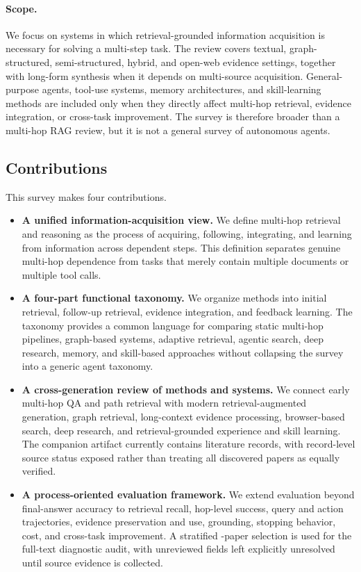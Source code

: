 \paragraph{Scope.}
We focus on systems in which retrieval-grounded information acquisition is necessary for solving a multi-step task. The review covers textual, graph-structured, semi-structured, hybrid, and open-web evidence settings, together with long-form synthesis when it depends on multi-source acquisition. General-purpose agents, tool-use systems, memory architectures, and skill-learning methods are included only when they directly affect multi-hop retrieval, evidence integration, or cross-task improvement. The survey is therefore broader than a multi-hop RAG review, but it is not a general survey of autonomous agents.

\subsection{Contributions}
\label{subsec:contributions}

This survey makes four contributions.

\begin{itemize}[leftmargin=1.35em]
\item \textbf{A unified information-acquisition view.} We define multi-hop retrieval and reasoning as the process of acquiring, following, integrating, and learning from information across dependent steps. This definition separates genuine multi-hop dependence from tasks that merely contain multiple documents or multiple tool calls.

\item \textbf{A four-part functional taxonomy.} We organize methods into initial retrieval, follow-up retrieval, evidence integration, and feedback learning. The taxonomy provides a common language for comparing static multi-hop pipelines, graph-based systems, adaptive retrieval, agentic search, deep research, memory, and skill-based approaches without collapsing the survey into a generic agent taxonomy.

\item \textbf{A cross-generation review of methods and systems.} We connect early multi-hop QA and path retrieval with modern retrieval-augmented generation, graph retrieval, long-context evidence processing, browser-based search, deep research, and retrieval-grounded experience and skill learning. The companion artifact currently contains \CorpusSize{} literature records, with record-level source status exposed rather than treating all discovered papers as equally verified.

\item \textbf{A process-oriented evaluation framework.} We extend evaluation beyond final-answer accuracy to retrieval recall, hop-level success, query and action trajectories, evidence preservation and use, grounding, stopping behavior, cost, and cross-task improvement. A stratified \AuditSize-paper selection is used for the full-text diagnostic audit, with unreviewed fields left explicitly unresolved until source evidence is collected.
\end{itemize}

